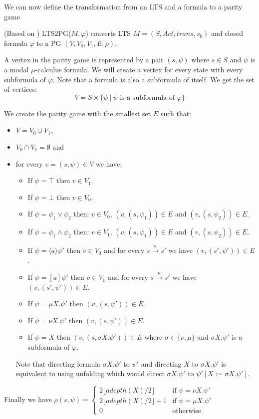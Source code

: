 We can now define the transformation from an LTS and a formula to a parity game.
\begin{definition}
	\label{def_LTS2PG}(Based on \cite{Bradfield2018})
	LTS2PG($M, \varphi$) converts LTS $M = (S, Act, trans, s_0)$ and closed formula $\varphi$ to a PG $(V, V_0, V_1, E, \rho)$.
	
	A vertex in the parity game is represented by a pair $(s, \psi)$ where $s \in S$ and $\psi$ is a modal $\mu$-calculus formula. We will create a vertex for every state with every subformula of $\varphi$. Note that a formula is also a subformula of itself. We get the set of vertices:
	\[ V = S \times \{ \psi\ |\ \psi \text{ is a subformula of } \varphi \} \]
	
	We create the parity game with the smallest set $E$ such that:
	\begin{itemize}
		\item $V = V_0 \cup V_1$,
		\item $V_0 \cap V_1 = \emptyset$ and
		\item for every $v = (s, \psi) \in V$ we have:
		\begin{itemize}
			\item If $\psi = \top$ then $v \in V_1$.
			\item If $\psi = \bot$ then $v \in V_0$.
			\item If $\psi = \psi_1 \vee \psi_2$ then:
			\subitem $v \in V_0$,
			\subitem $(v, (s,\psi_1)) \in E$ and
			\subitem $(v, (s,\psi_2)) \in E$.
			\item If $\psi = \psi_1 \wedge \psi_2$ then:
			\subitem $v \in V_1$,
			\subitem $(v, (s,\psi_1)) \in E$ and
			\subitem $(v, (s,\psi_2)) \in E$.
			\item If $\psi = \langle a \rangle \psi'$ then $v \in V_0$ and for every $s \xrightarrow{ a} s'$ we have $(v, (s', \psi')) \in E$.
			\item If $\psi = [ a ] \psi'$ then $v \in V_1$ and for every $s \xrightarrow{ a} s'$ we have  $(v, (s', \psi')) \in E$.
			\item If $\psi = \mu X. \psi'$ then $(v, (s, \psi')) \in E$.
			\item If $\psi = \nu X. \psi'$ then $(v, (s, \psi')) \in E$.
			\item If $\psi = X$ then $(v, (s, \sigma X. \psi')) \in E$ where $\sigma \in \{\nu,\mu\}$ and $\sigma X. \psi'$ is a subformula of $\varphi$.
		\end{itemize}
		Note that directing formula $\sigma X. \psi'$ to $\psi'$ and directing $X$ to $\sigma X. \psi'$ is equivalent to using unfolding which would direct $\sigma X. \psi'$ to $\psi'[X:=\sigma X. \psi']$.
	\end{itemize}
	
	
	Finally we have $\rho(s, \psi) = \begin{cases}
	2 \lfloor adepth(X) / 2 \rfloor & \text{if } \psi = \nu X. \psi'\\
	2 \lfloor adepth(X) / 2 \rfloor + 1 & \text{if } \psi = \mu X. \psi'\\
	0 & \text{otherwise}
	\end{cases}$
\end{definition}
